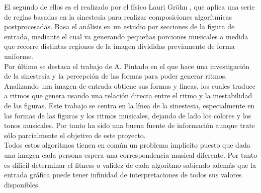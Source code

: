 El segundo de ellos es el realizado por el físico Lauri Gröhn \cite{rusofotos}, que aplica una serie de reglas basadas en la sinestesia para realizar composiciones algorítmicas postprocesadas. Basa el análisis en un estudio por secciones de la figura de entrada, mediante el cual va generando pequeñas porciones musicales a medida que recorre distintas regiones de la imagen divididas previamente de forma uniforme.\\

Por último se destaca el trabajo de A. Pintado \cite{portutesis} en el que hace una investigación de la sinestesia y la percepción de las formas para poder generar ritmos. Analizando una imagen de entrada obtiene sus formas y líneas, los cuales traduce a ritmos que genera usando  una relación directa entre el ritmo y la inestabilidad de las figuras. Este trabajo se centra en la línea de la sinestesia, especialmente en las formas de las figuras y los ritmos musicales, dejando de lado los colores y los tonos musicales. Por tanto ha sido una buena fuente de información aunque trate sólo parcialmente el objetivo de este proyecto.\\ 

Todos estos algoritmos tienen en común un problema implícito puesto que dada una imagen cada persona espera una correspondencia musical diferente. Por tanto es difícil determinar el fitness o validez de cada algoritmo sabiendo además que la entrada gráfica puede tener infinidad de interpretaciones de todos sus valores disponibles.

